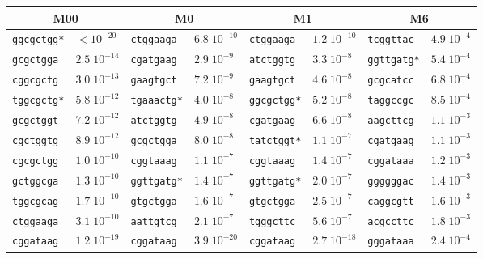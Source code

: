 \documentclass[dvips, lscape]{foils}
\begin{document}
\newpage
\begin{table}[h]
  \begin{center}
    {\footnotesize
      \begin{tabular}{llllllll}
       \multicolumn{2}{c}{M00} & \multicolumn{2}{c}{M0} &
       \multicolumn{2}{c}{M1} & \multicolumn{2}{c}{M6} \\
      \hline
 {\tt ggcgctgg*} & $< 10^{-20}   $  &  {\tt ctggaaga~} & $6.8\;10^{-10}$  &  {\tt ctggaaga~} & $1.2\;10^{-10}$  &  {\tt tcggttac~} & $4.9\;10^{-4}$ \\
 {\tt gcgctgga~} & $2.5\;10^{-14}$  &  {\tt cgatgaag~} & $2.9\;10^{-9}$  &  {\tt atctggtg~} & $3.3\;10^{-8}$  &  {\tt ggttgatg*} & $5.4\;10^{-4}$ \\
 {\tt cggcgctg~} & $3.0\;10^{-13}$  &  {\tt gaagtgct~} & $7.2\;10^{-9}$  &  {\tt gaagtgct~} & $4.6\;10^{-8}$  &  {\tt gcgcatcc~} & $6.8\;10^{-4}$ \\
 {\tt tggcgctg*} & $5.8\;10^{-12}$  &  {\tt tgaaactg*} & $4.0\;10^{-8}$  &  {\tt ggcgctgg*} & $5.2\;10^{-8}$  &  {\tt taggccgc~} & $8.5\;10^{-4}$ \\
 {\tt gcgctggt~} & $7.2\;10^{-12}$  &  {\tt atctggtg~} & $4.9\;10^{-8}$  &  {\tt cgatgaag~} & $6.6\;10^{-8}$  &  {\tt aagcttcg~} & $1.1\;10^{-3}$ \\
 {\tt cgctggtg~} & $8.9\;10^{-12}$  &  {\tt gcgctgga~} & $8.0\;10^{-8}$  &  {\tt tatctggt*} & $1.1\;10^{-7}$  &  {\tt cgatgaag~} & $1.1\;10^{-3}$ \\
 {\tt cgcgctgg~} & $1.0\;10^{-10}$  &  {\tt cggtaaag~} & $1.1\;10^{-7}$  &  {\tt cggtaaag~} & $1.4\;10^{-7}$  &  {\tt cggataaa~} & $1.2\;10^{-3}$ \\
 {\tt gctggcga~} & $1.3\;10^{-10}$  &  {\tt ggttgatg*} & $1.4\;10^{-7}$  &  {\tt ggttgatg*} & $2.0\;10^{-7}$  &  {\tt ggggggac~} & $1.4\;10^{-3}$ \\
 {\tt tggcgcag~} & $1.7\;10^{-10}$  &  {\tt gtgctgga~} & $1.6\;10^{-7}$  &  {\tt gtgctgga~} & $2.5\;10^{-7}$  &  {\tt caggcgtt~} & $1.6\;10^{-3}$ \\
 {\tt ctggaaga~} & $3.1\;10^{-10}$  &  {\tt aattgtcg~} & $2.1\;10^{-7}$  &  {\tt tgggcttc~} & $5.6\;10^{-7}$  &  {\tt acgccttc~} & $1.8\;10^{-3}$ \\
\hline
\hline
 {\tt cggataag~} & $1.2\;10^{-19}$  &  {\tt cggataag~} & $3.9\;10^{-20}$  &  {\tt cggataag~} & $2.7\;10^{-18}$  &  {\tt gggataaa~} & $2.4\;10^{-4}$ \\

\end{tabular}}
\end{center}
\end{table}
\end{document}
